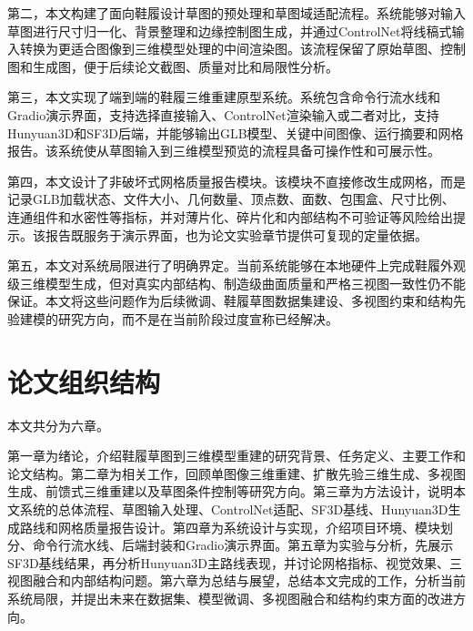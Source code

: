 第二，本文构建了面向鞋履设计草图的预处理和草图域适配流程。系统能够对输入草图进行尺寸归一化、背景整理和边缘控制图生成，并通过ControlNet将线稿式输入转换为更适合图像到三维模型处理的中间渲染图。该流程保留了原始草图、控制图和生成图，便于后续论文截图、质量对比和局限性分析。

第三，本文实现了端到端的鞋履三维重建原型系统。系统包含命令行流水线和Gradio演示界面，支持选择直接输入、ControlNet渲染输入或二者对比，支持Hunyuan3D和SF3D后端，并能够输出GLB模型、关键中间图像、运行摘要和网格报告。该系统使从草图输入到三维模型预览的流程具备可操作性和可展示性。

第四，本文设计了非破坏式网格质量报告模块。该模块不直接修改生成网格，而是记录GLB加载状态、文件大小、几何数量、顶点数、面数、包围盒、尺寸比例、连通组件和水密性等指标，并对薄片化、碎片化和内部结构不可验证等风险给出提示。该报告既服务于演示界面，也为论文实验章节提供可复现的定量依据。

第五，本文对系统局限进行了明确界定。当前系统能够在本地硬件上完成鞋履外观级三维模型生成，但对真实内部结构、制造级曲面质量和严格三视图一致性仍不能保证。本文将这些问题作为后续微调、鞋履草图数据集建设、多视图约束和结构先验建模的研究方向，而不是在当前阶段过度宣称已经解决。

\clearpage

\section{论文组织结构}

本文共分为六章。

第一章为绪论，介绍鞋履草图到三维模型重建的研究背景、任务定义、主要工作和论文结构。第二章为相关工作，回顾单图像三维重建、扩散先验三维生成、多视图生成、前馈式三维重建以及草图条件控制等研究方向。第三章为方法设计，说明本文系统的总体流程、草图输入处理、ControlNet适配、SF3D基线、Hunyuan3D生成路线和网格质量报告设计。第四章为系统设计与实现，介绍项目环境、模块划分、命令行流水线、后端封装和Gradio演示界面。第五章为实验与分析，先展示SF3D基线结果，再分析Hunyuan3D主路线表现，并讨论网格指标、视觉效果、三视图融合和内部结构问题。第六章为总结与展望，总结本文完成的工作，分析当前系统局限，并提出未来在数据集、模型微调、多视图融合和结构约束方面的改进方向。

